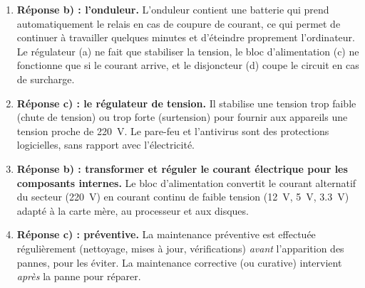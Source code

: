 \documentclass[11pt]{article}
\begin{document}
\begin{corrige}
\begin{enumerate}
\item \textbf{Réponse b) : l'onduleur.} L'onduleur contient une batterie qui prend automatiquement le relais en cas de coupure de courant, ce qui permet de continuer à travailler quelques minutes et d'éteindre proprement l'ordinateur. Le régulateur (a) ne fait que stabiliser la tension, le bloc d'alimentation (c) ne fonctionne que si le courant arrive, et le disjoncteur (d) coupe le circuit en cas de surcharge.
\item \textbf{Réponse c) : le régulateur de tension.} Il stabilise une tension trop faible (chute de tension) ou trop forte (surtension) pour fournir aux appareils une tension proche de \SI{220}{V}. Le pare-feu et l'antivirus sont des protections logicielles, sans rapport avec l'électricité.
\item \textbf{Réponse b) : transformer et réguler le courant électrique pour les composants internes.} Le bloc d'alimentation convertit le courant alternatif du secteur (\SI{220}{V}) en courant continu de faible tension (\SI{12}{V}, \SI{5}{V}, \SI{3,3}{V}) adapté à la carte mère, au processeur et aux disques.
\item \textbf{Réponse c) : préventive.} La maintenance préventive est effectuée régulièrement (nettoyage, mises à jour, vérifications) \emph{avant} l'apparition des pannes, pour les éviter. La maintenance corrective (ou curative) intervient \emph{après} la panne pour réparer.
\end{enumerate}
\end{corrige}
\end{document}
